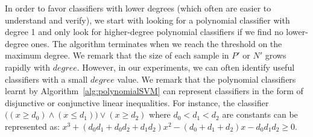 In order to favor classifiers with lower degrees (which often are easier to understand and verify), 
we start with looking for a polynomial classifier with degree 1 and only look for higher-degree polynomial classifiers if we find no lower-degree ones.
The algorithm terminates when we reach the threshold on the maximum degree.
We remark that the size of each sample in $P'$ or $N'$ grows rapidly with $\mathit{degree}$. 
However, in our experiments, we can often identify useful classifiers with a small $\mathit{degree}$ value.
We remark that the polynomial classifiers learnt by Algorithm~\ref{alg:polynomialSVM} can represent classifiers in the form of disjunctive or conjunctive linear inequalities.
For instance, the classifier $\big((x \ge d_0) \wedge (x \le d_1)\big) \vee (x \ge d_2)$
where $\mathit{d_0 < d_1 < d_2}$ are constants can be represented as: $\mathit{x^3 + (d_0d_1 + d_0d_2 + d_1d_2)x^2 - (d_0 + d_1 + d_2)x - d_0d_1d_2 \geq 0}$.








